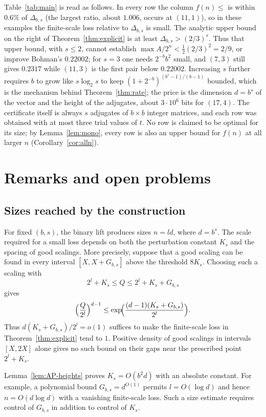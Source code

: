 \documentclass[12pt]{article}
\begin{document}
Table~\ref{tab:main} is read as follows. In every row the column $f(n)\le$ is within $0.6\%$ of $\Delta_{b,s}$ (the largest
ratio, about $1.006$, occurs at $(11,1)$), so in these examples the finite-scale loss relative to $\Delta_{b,s}$ is small.
The analytic upper bound on the right of Theorem~\ref{thm:explicit} is at least $\Delta_{b,s}>(2/3)^s$. Thus that
upper bound, with $s\le2$, cannot establish $\max A/2^n<\frac12(2/3)^2=2/9$, or improve Bohman's $0.22002$; for $s=3$ one needs
$2^{-b}b^2$ small, and $(7,3)$ still gives $0.2317$ while $(11,3)$ is the first pair below $0.22002$. Increasing $s$
further requires $b$ to grow like $s\log_2s$ to keep $(1+2^{-b})^{(b^s-1)/(b-1)}$ bounded, which is the mechanism behind
Theorem~\ref{thm:rate}; the price is the dimension $d=b^s$ of the vector and the height of the adjugates, about
$3\cdot10^6$ bits for $(17,4)$. The certificate itself is always $s$ adjugates of $b\times b$ integer matrices, and each row
was obtained with at most three trial values of $t$. No row is claimed to be optimal for its size; by
Lemma~\ref{lem:mono}, every row is also an upper bound for $f(n)$ at all larger $n$ (Corollary~\ref{cor:alln}).

\section{Remarks and open problems}\label{sec:remarks}

\subsection{Sizes reached by the construction}
For fixed $(b,s)$, the binary lift produces sizes $n=ld$, where $d=b^s$.
The scale required for a small loss depends on both the perturbation
constant $K_s$ and the spacing of good scalings. More precisely, suppose
that a good scaling can be found in every interval $[X,X+G_{b,s}]$ above
the threshold $8K_s$. Choosing such a scaling with
\[
 2^l+K_s\le Q\le2^l+K_s+G_{b,s}
\]
gives
\[
 \Bigl(\frac Q{2^l}\Bigr)^{d-1}
 \le \exp\!\Bigl(\frac{(d-1)(K_s+G_{b,s})}{2^l}\Bigr).
\]
Thus $d(K_s+G_{b,s})/2^l=o(1)$ suffices to make the finite-scale loss
in Theorem~\ref{thm:explicit} tend to $1$. Positive density of good
scalings in intervals $[X,2X]$ alone gives no such bound on their gaps
near the prescribed point $2^l+K_s$.

Lemma~\ref{lem:AP-heights} proves $K_s=O(b^2d)$ with an absolute
constant. For example, a polynomial bound $G_{b,s}=d^{O(1)}$ permits
$l=O(\log d)$ and hence $n=O(d\log d)$ with a vanishing finite-scale
loss. Such a size estimate requires control of $G_{b,s}$ in addition
to control of $K_s$.
\end{document}
